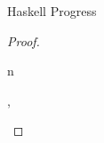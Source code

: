 \begin{theorem}{Haskell Progress}
\begin{proof}
\begin{case}{\psfix}
\end{case}


\newcommand{\psop}{\expop{\first{\varexph}}{\second{\varexph}}\xspace}
\renewcommand{\x}{\first{\expnum{\varnum}}\xspace}
\renewcommand{\y}{\second{\expnum{\varnum}}\xspace}

\begin{case}{\psop}

\pshypby
{\first{\varexph}}
{\third{\varexph}}
\psvalifeqh
{\first{\varexph}}
{\tynum}
{\x}
\pssub
{\first{\varexph}}
{\third{\varexph}}
{\psop}
{\expop{\third{\varexph}}{\second{\varexph}}}
\pserr
{\first{\varexph}}
{\psop}
\pshypby
{\second{\varexph}}
{\third{\varexph}}
\psvalifeqh
{\second{\varexph}}
{\tynum}
{\y}
\pssuband
{\second{\varexph}}
{\third{\varexph}}
{\first{\varexph}}
{\psop}
{\expop{\first{\varexph}}{\third{\varexph}}}
\pserrand
{\second{\varexph}}
{\first{\varexph}}
{\psop}
\psred
{\expadd{\x}{\y}}
{\expnum{\first{\varnum} + \second{\varnum}}}
\psred
{\expsub{\x}{\y}}
{}

\end{case}


\newcommand{\psif}{\expif{\first{\varexph}}{\second{\varexph}}{\third{\varexph}}\xspace}
\renewcommand{\x}{\expnum{\varnum}\xspace}

\begin{case}{\psif}

\pshypby
{\first{\varexph}}
{\fourth{\varexph}}
\psvalifeqh
{\first{\varexph}}
{\tynum}
{\x}
\psred
{}
{\second{\varexph}}
\psrednote
{\expif{\x}{\second{\varexph}}{\third{\varexph}}}
{\third{\varexph}}
{n }
\pssub
{\first{\varexph}}
{\fourth{\varexph}}
{\psif}
{\expif{\fourth{\varexph}}{\second{\varexph}}{\third{\varexph}}}
\pserr
{\first{\varexph}}
{\psif}

\end{case}


\newcommand{\psfield}{\expfield{\first{\varexph}}\xspace}
\renewcommand{\x}{\expnils{\vartyh}\xspace}
\renewcommand{\y}{\expcons{\second{\varexph}}{\third{\varexph}}\xspace}

\begin{case}{\psfield}

\pshypby
{\first{\varexph}}
{\second{\varexph}}
\psvalifinh
{\first{\varexph}}
{\tylist{\vartyh}}
{\x, \y}
\psred
{\exphd{(\x)}}
{\expwrongs{\vartyh}{\errempty}}
\psred
{\exptl{(\x)}}
{\expwrongs{\tylist{\vartyh}}{\errempty}}
\psred
{\exphd{(\y)}}
{\second{\varexph}}
\psred
{\exptl{(\y)}}
{\third{\varexph}}
\pssub
{\first{\varexph}}
{\second{\varexph}}
{\psfield}
{\expfield{\second{\varexph}}}
\pserr
{\first{\varexph}}
{\psfield}


\end{case}
\end{proof}
\end{theorem}
